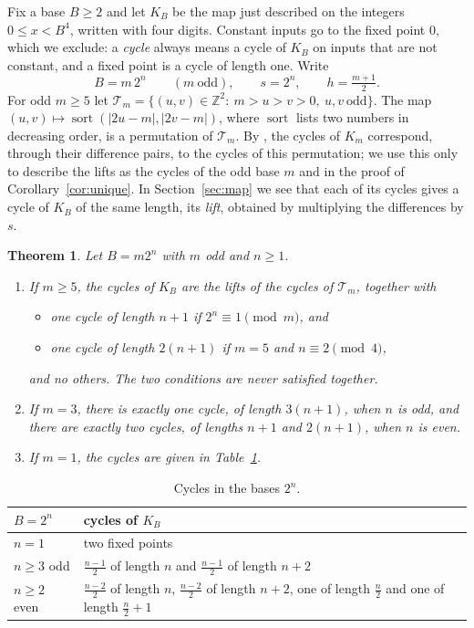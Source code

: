 \documentclass[11pt]{amsart}
\newtheorem{theorem}{Theorem}
\theoremstyle{definition}
\theoremstyle{remark}
\DeclareMathOperator{\sort}{sort}
\newcommand{\T}{\mathcal{T}}
\begin{document}
Fix a base $B\ge2$ and let $K_B$ be the map just described on the integers $0\le x<B^4$, written with four digits. Constant inputs go to the fixed point $0$, which we exclude: a \emph{cycle} always means a cycle of $K_B$ on inputs that are not constant, and a fixed point is a cycle of length one. Write
\[
B=m\,2^n\qquad(m\ \text{odd}),\qquad s=2^n,\qquad h=\tfrac{m+1}{2}.
\]
For odd $m\ge5$ let $\T_m=\{(u,v)\in\mathbb Z^2:\ m>u>v>0,\ u,v\ \text{odd}\}$. The map $(u,v)\mapsto\sort(|2u-m|,|2v-m|)$, where $\sort$ lists two numbers in decreasing order, is a permutation of $\T_m$. By \cite[Theorem~1]{COST}, the cycles of $K_m$ correspond, through their difference pairs, to the cycles of this permutation; we use this only to describe the lifts as the cycles of the odd base $m$ and in the proof of Corollary~\ref{cor:unique}. In Section~\ref{sec:map} we see that each of its cycles gives a cycle of $K_B$ of the same length, its \emph{lift}, obtained by multiplying the differences by $s$.

\begin{theorem}\label{thm:main}
Let $B=m2^n$ with $m$ odd and $n\ge1$.
\begin{enumerate}
\item[(a)] If $m\ge5$, the cycles of $K_B$ are the lifts of the cycles of $\T_m$, together with
\begin{itemize}
\item one cycle of length $n+1$ if $2^n\equiv1\pmod m$, and
\item one cycle of length $2(n+1)$ if $m=5$ and $n\equiv2\pmod4$,
\end{itemize}
and no others. The two conditions are never satisfied together.
\item[(b)] If $m=3$, there is exactly one cycle, of length $3(n+1)$, when $n$ is odd, and there are exactly two cycles, of lengths $n+1$ and $2(n+1)$, when $n$ is even.
\item[(c)] If $m=1$, the cycles are given in Table~\ref{tab:powers}.
\end{enumerate}
\end{theorem}

\begin{table}[h]
\centering
\begin{tabular}{@{}lp{9.2cm}@{}}
\toprule
$B=2^n$ & cycles of $K_B$ \\
\midrule
$n=1$ & two fixed points \\
$n\ge3$ odd & $\tfrac{n-1}{2}$ of length $n$ and $\tfrac{n-1}{2}$ of length $n+2$ \\
$n\ge2$ even & $\tfrac{n-2}{2}$ of length $n$, $\tfrac{n-2}{2}$ of length $n+2$, one of length $\tfrac n2$ and one of length $\tfrac n2+1$ \\
\bottomrule
\end{tabular}
\caption{Cycles in the bases $2^n$.}\label{tab:powers}
\end{table}
\end{document}
